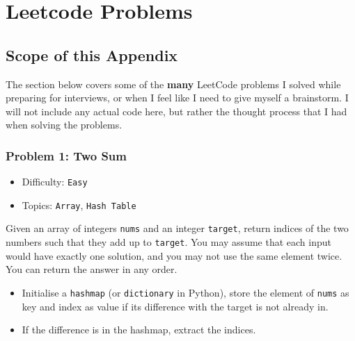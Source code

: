 
\chapter{Leetcode Problems}

\section{Scope of this Appendix}
The section below covers some of the \textbf{many} LeetCode problems I solved while preparing for interviews, 
or when I feel like I need to give myself a brainstorm. I will not include any actual code here, but rather 
the thought process that I had when solving the problems.


\subsection*{Problem 1: Two Sum}
\begin{itemize}
    \setlength\itemsep{0.1em}  %
    \setlength\parskip{0pt}    %
    \item Difficulty: \texttt{Easy}
    \item Topics: \texttt{Array}, \texttt{Hash Table}
\end{itemize}

\begin{tcolorbox}[colback=gray!5!white, colframe=gray!80!black, boxrule=0.5pt, arc=2pt, left=6pt, right=6pt, top=6pt, bottom=6pt]
    Given an array of integers \texttt{nums} and an integer \texttt{target}, return indices of the two
    numbers such that they add up to \texttt{target}. You may assume that each input would have
    exactly one solution, and you may not use the same element twice. You can return the
    answer in any order.
\end{tcolorbox}

\begin{itemize}
    \item Initialise a \texttt{hashmap} (or \texttt{dictionary} in Python), store the element of 
    \texttt{nums} as key and index as value if its difference with the target is not already in.
    \item If the difference is in the hashmap, extract the indices.
\end{itemize}

